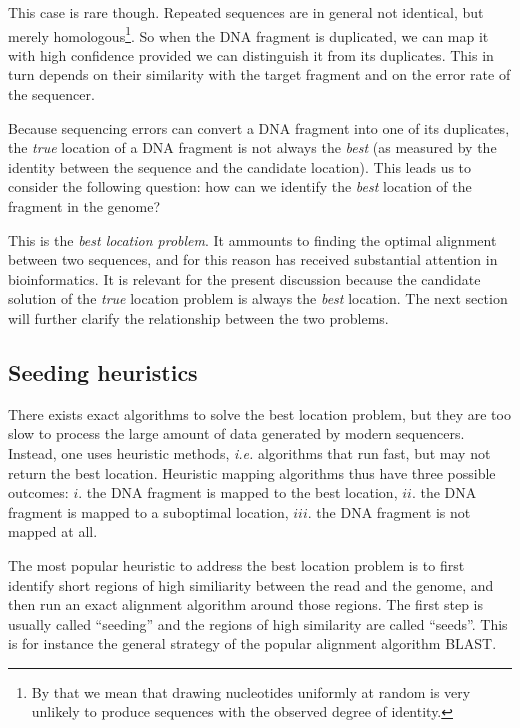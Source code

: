 \documentclass{article}
\begin{document}
This case is rare though. Repeated sequences are in general not identical,
but merely homologous\footnote{By that we mean that drawing nucleotides
uniformly at random is very unlikely to produce sequences with the
observed degree of identity.}. So when the DNA fragment is duplicated, we
can map it with high confidence provided we can distinguish it from its
duplicates. This in turn depends on their similarity with the target
fragment and on the error rate of the sequencer.

Because sequencing errors can convert a DNA fragment into one of its
duplicates, the \emph{true} location of a DNA fragment is not always the
\emph{best} (as measured by the identity between the sequence and the
candidate location). This leads us to consider the following question: how
can we identify the \emph{best} location of the fragment in the genome? 

This is the \emph{best location problem}. It ammounts to finding the
optimal alignment between two sequences, and for this reason has received
substantial attention in bioinformatics. It is relevant for the present
discussion because the candidate solution of the \emph{true} location
problem is always the \emph{best} location. The next section will further
clarify the relationship between the two problems.


\subsection{Seeding heuristics}

There exists exact algorithms to solve the best location
problem\cite{pmid7265238,pmid5420325}, but they are too slow to process
the large amount of data generated by modern sequencers. Instead, one uses
heuristic methods, \textit{i.e.} algorithms that run fast, but may not
return the best location\cite{Waterman1984}. Heuristic mapping algorithms
thus have three possible outcomes: $i.$ the DNA fragment is mapped to the
best location, $ii.$ the DNA fragment is mapped to a suboptimal location,
$iii.$ the DNA fragment is not mapped at all.

The most popular heuristic to address the best location problem is to
first identify short regions of high similiarity between the read and the
genome, and then run an exact alignment algorithm around those regions.
The first step is usually called ``seeding'' and the regions of high
similarity are called ``seeds''. This is for instance the general strategy
of the popular alignment algorithm BLAST\cite{pmid2231712}.
\end{document}
